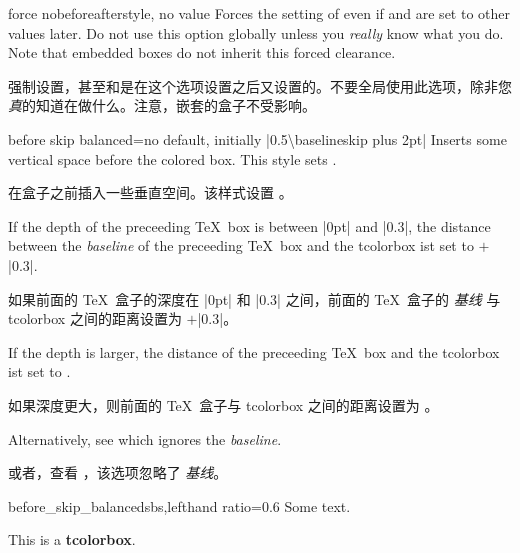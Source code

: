 \begin{docTcbKey}{force nobeforeafter}{}{style, no value}
Forces the setting of  even if
 and  are set to other values
later. Do not use this option globally unless you \emph{really} know what you do.
Note that embedded boxes do not inherit this forced clearance.

强制设置，甚至和是在这个选项设置之后又设置的。不要全局使用此选项，除非您\emph{真}的知道在做什么。注意，嵌套的盒子不受影响。
\end{docTcbKey}



\begin{docTcbKey}[][doc new={2020-09-25}]{before skip balanced}{=}{no default, initially |0.5\textbackslash baselineskip plus 2pt|}
Inserts some vertical space before the colored box. This style sets .\par
在盒子之前插入一些垂直空间。该样式设置 。\par
If the depth of the
preceeding \TeX\ box is between |0pt| and |0.3\baselineskip|,
the distance between the \emph{baseline} of the preceeding \TeX\ box and the tcolorbox
ist set to $+$|0.3\baselineskip|.\par
如果前面的 \TeX\ 盒子的深度在 |0pt| 和 |0.3\baselineskip| 之间，前面的 \TeX\ 盒子的 \emph{基线} 与 tcolorbox 之间的距离设置为 $+$|0.3\baselineskip|。\par
If the depth is larger, the distance of the preceeding \TeX\ box and the tcolorbox
ist set to .\par
如果深度更大，则前面的 \TeX\ 盒子与 tcolorbox 之间的距离设置为 。\par
Alternatively, see  which ignores the \emph{baseline}.

 或者，查看 ，该选项忽略了 \emph{基线}。

\begin{exdispExample*}{before_skip_balanced}{sbs,lefthand ratio=0.6}
Some text.
\begin{tcolorbox}[before skip balanced=1cm,
colframe=red!50!white]
This is a \textbf{tcolorbox}.
\end{tcolorbox}
\end{exdispExample*}
\end{docTcbKey}


